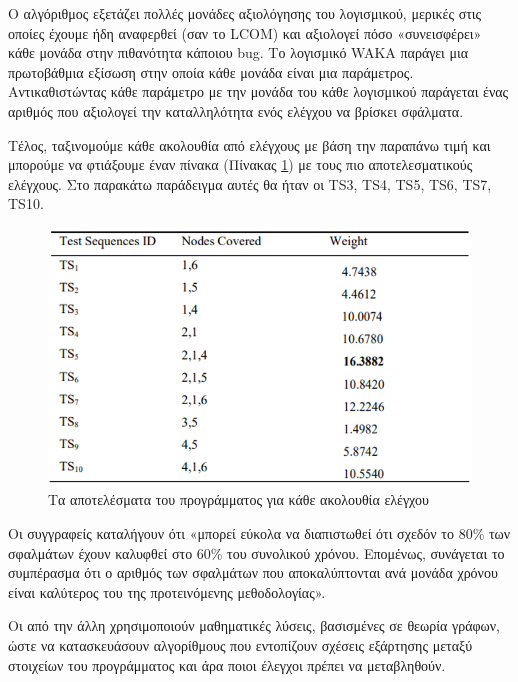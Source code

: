 \documentclass[12pt]{article}
\begin{document}
\par Ο αλγόριθμος εξετάζει πολλές μονάδες αξιολόγησης του λογισμικού, μερικές στις οποίες έχουμε ήδη αναφερθεί (σαν το LCOM) και αξιολογεί πόσο «συνεισφέρει» κάθε μονάδα στην πιθανότητα κάποιου bug. Το λογισμικό WAKA παράγει μια πρωτοβάθμια εξίσωση στην οποία κάθε μονάδα είναι μια παράμετρος. Αντικαθιστώντας κάθε παράμετρο με την μονάδα του κάθε λογισμικού παράγεται ένας αριθμός που αξιολογεί την καταλληλότητα ενός ελέγχου να βρίσκει σφάλματα. 

\par Τέλος, ταξινομούμε κάθε ακολουθία από ελέγχους με βάση την παραπάνω τιμή και μπορούμε να φτιάξουμε έναν πίνακα (Πίνακας \ref{fig:test_table}) με τους πιο αποτελεσματικούς ελέγχους. Στο παρακάτω παράδειγμα αυτές θα ήταν οι TS3, TS4, TS5, TS6, TS7, TS10.

\begin{figure}
\label{fig:test_table}
\caption{Τα αποτελέσματα του προγράμματος για κάθε ακολουθία ελέγχου}
\includegraphics[width=\textwidth,height=\textheight,keepaspectratio]{test_table.PNG}
\end{figure}
 
\par Οι συγγραφείς καταλήγουν ότι «μπορεί εύκολα να διαπιστωθεί ότι σχεδόν το 80\% των σφαλμάτων έχουν καλυφθεί στο 60\% του συνολικού χρόνου. Επομένως, συνάγεται το συμπέρασμα ότι ο αριθμός των σφαλμάτων που αποκαλύπτονται ανά μονάδα χρόνου είναι καλύτερος του της προτεινόμενης μεθοδολογίας».

\par Οι \textcite{kung} από την άλλη χρησιμοποιούν μαθηματικές λύσεις, βασισμένες σε θεωρία γράφων, ώστε να κατασκευάσουν αλγορίθμους που εντοπίζουν σχέσεις εξάρτησης μεταξύ στοιχείων του προγράμματος και άρα ποιοι έλεγχοι πρέπει να μεταβληθούν.
\end{document}
